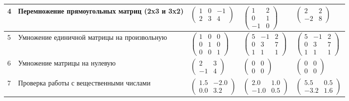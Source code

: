 \begin{table}[H]
\begin{center}
{\begin{tabular}{|x{1cm}|x{6cm}|x{3.5cm}|x{2.5cm}|x{4cm}|}
				4
				& Перемножение прямоугольных матриц (2x3 и 3x2)
				& $\begin{pmatrix}
					1 & 0 & -1\\
					2 & 3 & 4
				\end{pmatrix}$
				& $\begin{pmatrix}
					1 & 2\\
					0 & 1\\
					-1 & 0
				\end{pmatrix}$
				& $\begin{pmatrix}
					2 & 2\\
					-2 & 8
				\end{pmatrix}$
				\\ \hline
				
				5
				& Умножение единичной матрицы на произвольную
				& $\begin{pmatrix}
					1 & 0 & 0\\
					0 & 1 & 0\\
					0 & 0 & 1
				\end{pmatrix}$
				& $\begin{pmatrix}
					5 & -1 & 2\\
					0 & 3 & 7\\
					1 & 1 & 1
				\end{pmatrix}$
				& $\begin{pmatrix}
					5 & -1 & 2\\
					0 & 3 & 7\\
					1 & 1 & 1
				\end{pmatrix}$
				\\ \hline
				
				6
				& Умножение матрицы на нулевую
				& $\begin{pmatrix}
					2 & 3\\
					-1 & 4
				\end{pmatrix}$
				& $\begin{pmatrix}
					0 & 0\\
					0 & 0
				\end{pmatrix}$
				& $\begin{pmatrix}
					0 & 0\\
					0 & 0
				\end{pmatrix}$
				\\ \hline
				
				7
				& Проверка работы с вещественными числами
				& $\begin{pmatrix}
					1.5 & -2.0\\
					0.0 & 3.2
				\end{pmatrix}$
				& $\begin{pmatrix}
					2.0 & 1.0\\
					-1.0 & 0.5
				\end{pmatrix}$
				& $\begin{pmatrix}
					5.5 & 0.5\\
					-3.2 & 1.6
				\end{pmatrix}$
				\\ \hline
				

\end{tabular}}
\end{center}
\end{table}

